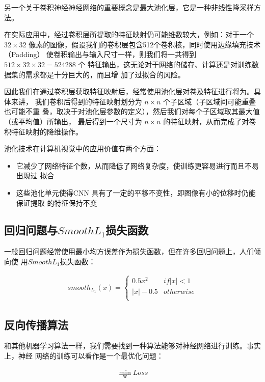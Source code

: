另一个关于卷积神经神经网络的重要概念是最大池化层，它是一种非线性降采样方法。

在实际应用中，经过卷积层所提取的特征映射仍可能维数较大，例如：对于一个 $32 \times
32$ 像素的图像，假设我们的卷积层包含512个卷积核，同时使用边缘填充技术（Padding）
使卷积输出与输入尺寸一样，则我们将一共得到 $512 \times 32 \times 32 = 524288$ 个
特征输出，这无论对于网络的储存、计算还是对训练数据集的需求都是十分巨大的，而且增
加了过拟合的风险。

因此我们在通过卷积层获取特征映射后，经常使用池化层对卷及特征进行将为。具体来讲，
我们卷积后得到的特征映射划分为 $n \times n$ 个子区域（子区域间可能重叠也可能不重
叠，取决于对池化层参数的定义），然后我们对每个子区域取其最大值（或平均值）所输出，
最后得到一个尺寸为 $n \times n$ 的特征映射，从而完成了对卷积特征映射的降维操作。

池化技术在计算机视觉中的应用价值有两个方面：

\begin{itemize}
\item 它减少了网络特征个数，从而降低了网络复杂度，使训练更容易进行而且不易出现过
  拟合
\item 这些池化单元使得CNN 具有了一定的平移不变性，即图像有小的位移时仍能保证提取
  的特征保持不变
\end{itemize}

\subsection{回归问题与$Smooth L_1$损失函数}

一般回归问题经常使用最小均方误差作为损失函数，但在许多回归问题上，人们倾向使
用$Smooth L_1$损失函数：

\begin{align}
smooth_{L_1}(x) = 
\begin{cases}
0.5x^2 & if |x| < 1 \\
|x| - 0.5 & otherwise \\
\end{cases}
\end{align}

\subsection{反向传播算法}

和其他机器学习算法一样，我们需要找到一种算法能够对神经网络进行训练。事实上，神经
网络的训练可以看作是一个最优化问题：

\begin{align}
\min_{\mathbf{w}}{Loss}
\end{align}

